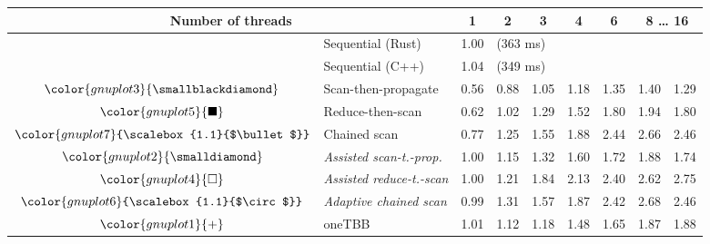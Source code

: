 \begin{tabular}{clrrrrrrr}
\toprule
\multicolumn{2}{c}{\textbf{Number of threads}} & \multicolumn{1}{c}{\textbf{ 1 }} & \multicolumn{1}{c}{\textbf{ 2 }} & \multicolumn{1}{c}{\textbf{ 3 }} & \multicolumn{1}{c}{\textbf{ 4 }} & \multicolumn{1}{c}{\textbf{ 6 }} & \multicolumn{2}{c}{\textbf{ 8 } \dots \textbf{ 16 }} \\
\midrule
& Sequential (Rust) & \multicolumn{1}{r}{ 1.00 } & \multicolumn{ 6 }{l}{(363 ms)} \\
& Sequential (C++) & \multicolumn{1}{r}{ 1.04 } & \multicolumn{ 6 }{l}{(349 ms)} \\
\rowcolor{gnuplot3!10}$\color{gnuplot3}{\smallblackdiamond}$ & Scan-then-propagate & \cellcolor{gnuplot3!10} 0.56 & \cellcolor{gnuplot3!10} 0.88 & \cellcolor{gnuplot3!10} 1.05 & \cellcolor{gnuplot3!10} 1.18 & \cellcolor{gnuplot3!10} 1.35 & \cellcolor{gnuplot3!10} 1.40 & \cellcolor{gnuplot3!10} 1.29 \\
\rowcolor{gnuplot5!10}$\color{gnuplot5}{\blacksquare}$ & Reduce-then-scan & \cellcolor{gnuplot5!10} 0.62 & \cellcolor{gnuplot5!10} 1.02 & \cellcolor{gnuplot5!10} 1.29 & \cellcolor{gnuplot5!10} 1.52 & \cellcolor{gnuplot5!10} 1.80 & \cellcolor{gnuplot5!10} 1.94 & \cellcolor{gnuplot5!10} 1.80 \\
\rowcolor{gnuplot7!10}$\color{gnuplot7}{\scalebox{1.1}{$\bullet$}}$ & Chained scan & \cellcolor{gnuplot7!10} 0.77 & \cellcolor{gnuplot7!10} 1.25 & \cellcolor{gnuplot7!10} 1.55 & \cellcolor{gnuplot7!10} 1.88 & \cellcolor{gnuplot7!10} 2.44 & \cellcolor{gnuplot7!10} 2.66 & \cellcolor{gnuplot7!10} 2.46 \\
\rowcolor{gnuplot2!30}$\color{gnuplot2}{\smalldiamond}$ & \textit{Assisted scan-t.-prop.} & \cellcolor{gnuplot2!30} 1.00 & \cellcolor{gnuplot2!30} 1.15 & \cellcolor{gnuplot2!30} 1.32 & \cellcolor{gnuplot2!30} 1.60 & \cellcolor{gnuplot2!30} 1.72 & \cellcolor{gnuplot2!30} 1.88 & \cellcolor{gnuplot2!30} 1.74 \\
\rowcolor{gnuplot4!30}$\color{gnuplot4}{\square}$ & \textit{Assisted reduce-t.-scan} & \cellcolor{gnuplot4!30} 1.00 & \cellcolor{gnuplot4!30} 1.21 & \cellcolor{gnuplot4!30} 1.84 & \cellcolor{gnuplot4!30} 2.13 & \cellcolor{gnuplot4!30} 2.40 & \cellcolor{gnuplot4!30} 2.62 & \cellcolor{gnuplot4!30} 2.75 \\
\rowcolor{gnuplot6!30}$\color{gnuplot6}{\scalebox{1.1}{$\circ$}}$ & \textit{Adaptive chained scan} & \cellcolor{gnuplot6!30} 0.99 & \cellcolor{gnuplot6!30} 1.31 & \cellcolor{gnuplot6!30} 1.57 & \cellcolor{gnuplot6!30} 1.87 & \cellcolor{gnuplot6!30} 2.42 & \cellcolor{gnuplot6!30} 2.68 & \cellcolor{gnuplot6!30} 2.46 \\
\rowcolor{gnuplot1!10}$\color{gnuplot1}{+}$ & oneTBB & \cellcolor{gnuplot1!10} 1.01 & \cellcolor{gnuplot1!10} 1.12 & \cellcolor{gnuplot1!10} 1.18 & \cellcolor{gnuplot1!10} 1.48 & \cellcolor{gnuplot1!10} 1.65 & \cellcolor{gnuplot1!10} 1.87 & \cellcolor{gnuplot1!10} 1.88 \\
\bottomrule
\end{tabular}
